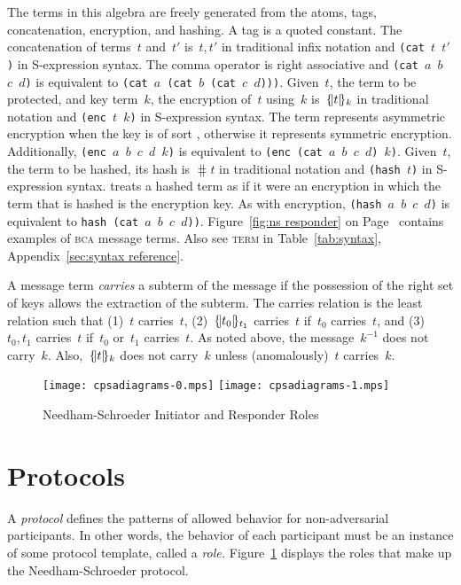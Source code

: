 \documentclass[12pt]{article}
\begin{document}
The terms in this algebra are freely generated from the atoms, tags,
concatenation, encryption, and hashing.  A tag is a quoted constant.
The concatenation of terms~$t$ and~$t'$ is~$t,t'$ in traditional infix
notation and \texttt{(cat $t$ $t'$)} in S-expression syntax.  The
comma operator is right associative and \texttt{(cat $a$ $b$ $c$ $d$)}
is equivalent to \texttt{(cat $a$ (cat $b$ (cat $c$ $d$)))}.
Given~$t$, the term to be protected, and key term~$k$, the encryption
of~$t$ using~$k$ is~$\{\!|t|\!\}_{k}$ in traditional notation and
\texttt{(enc $t$ $k$)} in S-expression syntax.  The term represents
asymmetric encryption when the key is of sort , otherwise it
represents symmetric encryption.  Additionally, \texttt{(enc $a$ $b$
  $c$ $d$ $k$)} is equivalent to \texttt{(enc (cat $a$ $b$ $c$ $d$)
  $k$)}.  Given~$t$, the term to be hashed, its hash is $\hash{t}$ in
traditional notation and \texttt{(hash $t$)} in S-expression syntax.
{\cpsa} treats a hashed term as if it were an encryption in which the
term that is hashed is the encryption key.  As with encryption,
\texttt{(hash $a$ $b$ $c$ $d$)} is equivalent to \texttt{hash (cat $a$
  $b$ $c$ $d$))}.  Figure~\ref{fig:ns responder} on
Page~\pageref{fig:ns responder} contains examples of \textsc{bca}
message terms.  Also see \textsc{term} in Table~\ref{tab:syntax},
Appendix~\ref{sec:syntax reference}.

A message term \emph{carries} a subterm of the message
if the possession of the right set of keys allows the extraction of
the subterm.  The carries relation is the least relation such that
(1)~$t$ carries~$t$, (2)~$\{\!|t_0|\!\}_{t_1}$ carries~$t$ if~$t_0$
carries~$t$, and (3)~$t_0,t_1$ carries~$t$ if~$t_0$ or~$t_1$
carries~$t$.  As noted above, the message~$k^{-1}$ does not carry~$k$.
Also,~$\{\!|t|\!\}_{k}$ does not carry~$k$ unless (anomalously)~$t$
carries~$k$.

\begin{figure}
\begin{center}
\texttt{[image: cpsadiagrams-0.mps]}\hfil
\texttt{[image: cpsadiagrams-1.mps]}
\caption{Needham-Schroeder Initiator and Responder Roles}
\label{fig:ns roles}
\end{center}
\end{figure}

\section{Protocols}

A \emph{protocol} defines the patterns of allowed
behavior for non-adversarial participants.  In other words, the
behavior of each participant must be an instance of some protocol
template, called a \emph{role.}  Figure~\ref{fig:ns roles}
displays the roles that make up the Needham-Schroeder protocol.
\end{document}
